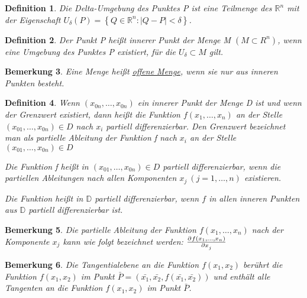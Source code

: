 \documentclass[fontset=ubuntu,11pt,a4paper,fleqn,headsepline]{scrreprt}
\newtheorem{defi}{Definition}[section]
\newtheorem{bemerkung}[defi]{Bemerkung}
\begin{document}
\begin{multicols}{2}
\begin{defi}
        Die Delta-Umgebung des Punktes P ist eine Teilmenge des \(\mathbb{R}^n\) mit der Eigenschaft \(U_\delta\left(P\right)=\left\{Q\in\mathbb{R}^n:\left|Q-P\right|<\delta\right\}\).
        
    \end{defi}

        \begin{defi}
            Der Punkt P heißt innerer Punkt der Menge M \((M \subset R^n)\), wenn eine Umgebung des Punktes P existiert, für die \(U_\delta \subset M\) gilt.
        \end{defi}
    
    \begin{bemerkung}
        Eine Menge heißt \underline{offene Menge}, wenn sie nur aus inneren Punkten besteht.
    \end{bemerkung}
    
    \begin{defi}
        Wenn \((x_{0n},\dots,x_{0n})\) ein innerer Punkt der Menge D ist und wenn der Grenzwert existiert, dann heißt die Funktion \(f(x_1,\dots,x_n)\) an der Stelle \((x_{01},\dots,x_{0n})\in D\) nach \(x_i\) partiell differenzierbar. Den Grenzwert bezeichnet man als partielle Ableitung der Funktion f nach \(x_i\) an der Stelle \((x_{01},\dots,x_{0n}) \in D\)
        
        Die Funktion f heißt in \((x_{01},\dots,x_{0n}) \in D\) partiell differenzierbar, wenn die partiellen Ableitungen nach allen Komponenten \(x_j\ (j=1,\dots,n)\) existieren.
        
        Die Funktion heißt in \(\mathbb{D}\) partiell differenzierbar, wenn \(f\) in allen inneren Punkten aus \(\mathbb{D}\) partiell differenzierbar ist.
    \end{defi}
    
    \begin{bemerkung}
        Die partielle Ableitung der Funktion \(f(x_1,\dots,x_n)\) nach der Komponente \(x_j\) kann wie folgt bezeichnet werden: \(\pd{f(x_1,\dots,x_n)}{x_j}\)
    \end{bemerkung}
    
    \begin{bemerkung}
        Die Tangentialebene an die Funktion \(f(x_1,x_2)\) berührt die Funktion \(f(x_1,x_2)\) im Punkt \(\bar{P}=(\bar{x_1},\bar{x_2},f(\bar{x_1},\bar{x_2}))\) und enthält alle Tangenten an die Funktion \(f(x_1,x_2)\) im Punkt \(\bar{P}\).
    \end{bemerkung}
    

\end{multicols}
\end{document}
